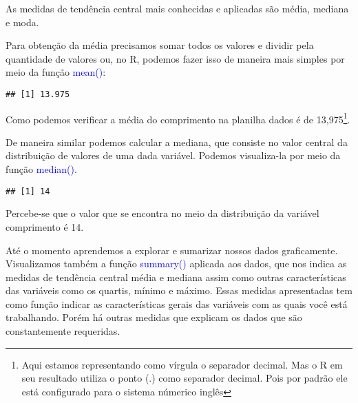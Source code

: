 \documentclass[14pt,titlepage, oneside, openany, a4paper]{book}
\newenvironment{Shaded}{\begin{snugshade}}{\end{snugshade}}
\newcommand{\KeywordTok}[1]{\textcolor[rgb]{0.13,0.29,0.53}{\textbf{#1}}}
\newcommand{\NormalTok}[1]{#1}
\newcommand{\OperatorTok}[1]{\textcolor[rgb]{0.81,0.36,0.00}{\textbf{#1}}}
\begin{document}
As medidas de tendência central mais conhecidas e aplicadas são média, mediana e moda.

Para obtenção da média precisamos somar todos os valores e dividir pela quantidade de valores ou, no R, podemos fazer isso de maneira mais simples por meio da função \textcolor{blue}{mean()}:

\begin{Shaded}
\end{Shaded}

\begin{verbatim}
## [1] 13.975
\end{verbatim}

Como podemos verificar a média do comprimento na planilha dados é de 13,975\footnote{Aqui estamos representando como vírgula o separador decimal. Mas o R em seu resultado utiliza o ponto (.) como separador decimal. Pois por padrão ele está configurado para o sistema númerico inglês}.

De maneira similar podemos calcular a mediana, que consiste no valor central da distribuição de valores de uma dada variável. Podemos visualiza-la por meio da função \textcolor{blue}{median()}.

\begin{Shaded}
\end{Shaded}

\begin{verbatim}
## [1] 14
\end{verbatim}

Percebe-se que o valor que se encontra no meio da distribuição da variável comprimento é 14.

Até o momento aprendemos a explorar e sumarizar nossos dados graficamente. Visualizamos também a função \textcolor{blue}{summary()} aplicada aos dados, que nos indica as medidas de tendência central média e mediana assim como outras características das variáveis como os quartis, mínimo e máximo. Essas medidas apresentadas tem como função indicar as características gerais das variáveis com as quais você está trabalhando. Porém há outras medidas que explicam os dados que são constantemente requeridas.
\end{document}
